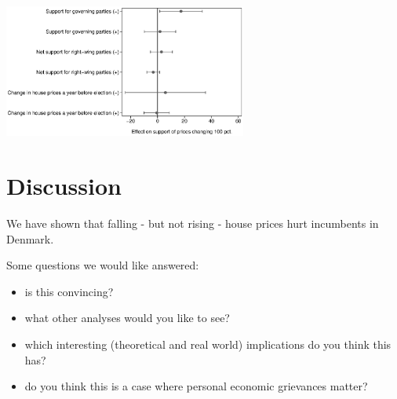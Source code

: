 \documentclass[aspectratio=169]{beamer}
\begin{document}
\begin{frame}
	\begin{center}
			\includegraphics[width=0.6\textwidth]{../../figures/robust.eps}
	\end{center}
\end{frame}	

\begin{frame}
	
\end{frame}	

\section{Discussion}

	\begin{frame}
	We have shown that falling - but not rising - house prices hurt incumbents in Denmark.
	
	\vspace{0.2in}
	
	Some questions we would like answered:
	\begin{itemize}
		\item is this convincing?
		\item what other analyses would you like to see?
		\item which interesting (theoretical and real world) implications do you think this has?
		\item do you think this is a case where personal economic grievances matter? 
	\end{itemize}	
		
	\end{frame}		
\end{document}
